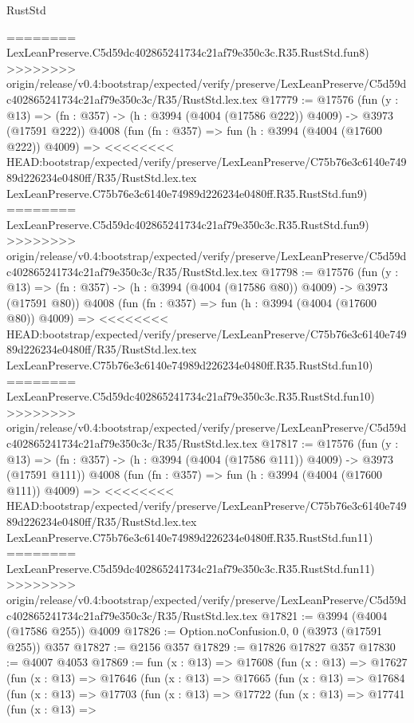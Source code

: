 \begin{lexlean}{RustStd}
\begin{coremodule}
{\begin{coremodule}
{{{{{{{{{{{{{{{{========
    LexLeanPreserve.C5d59dc402865241734c21af79e350c3c.R35.RustStd.fun8)
>>>>>>>> origin/release/v0.4:bootstrap/expected/verify/preserve/LexLeanPreserve/C5d59dc402865241734c21af79e350c3c/R35/RustStd.lex.tex
@17779 := @17576
    (fun (y : @13) => (fn : @357) -> (h : @3994 (@4004 (@17586 @222)) @4009) -> @3973 (@17591 @222))
    @4008
    (fun (fn : @357) =>
    fun (h : @3994 (@4004 (@17600 @222)) @4009) =>
<<<<<<<< HEAD:bootstrap/expected/verify/preserve/LexLeanPreserve/C75b76e3c6140e74989d226234e0480ff/R35/RustStd.lex.tex
    LexLeanPreserve.C75b76e3c6140e74989d226234e0480ff.R35.RustStd.fun9)
========
    LexLeanPreserve.C5d59dc402865241734c21af79e350c3c.R35.RustStd.fun9)
>>>>>>>> origin/release/v0.4:bootstrap/expected/verify/preserve/LexLeanPreserve/C5d59dc402865241734c21af79e350c3c/R35/RustStd.lex.tex
@17798 := @17576
    (fun (y : @13) => (fn : @357) -> (h : @3994 (@4004 (@17586 @80)) @4009) -> @3973 (@17591 @80))
    @4008
    (fun (fn : @357) =>
    fun (h : @3994 (@4004 (@17600 @80)) @4009) =>
<<<<<<<< HEAD:bootstrap/expected/verify/preserve/LexLeanPreserve/C75b76e3c6140e74989d226234e0480ff/R35/RustStd.lex.tex
    LexLeanPreserve.C75b76e3c6140e74989d226234e0480ff.R35.RustStd.fun10)
========
    LexLeanPreserve.C5d59dc402865241734c21af79e350c3c.R35.RustStd.fun10)
>>>>>>>> origin/release/v0.4:bootstrap/expected/verify/preserve/LexLeanPreserve/C5d59dc402865241734c21af79e350c3c/R35/RustStd.lex.tex
@17817 := @17576
    (fun (y : @13) => (fn : @357) -> (h : @3994 (@4004 (@17586 @111)) @4009) -> @3973 (@17591 @111))
    @4008
    (fun (fn : @357) =>
    fun (h : @3994 (@4004 (@17600 @111)) @4009) =>
<<<<<<<< HEAD:bootstrap/expected/verify/preserve/LexLeanPreserve/C75b76e3c6140e74989d226234e0480ff/R35/RustStd.lex.tex
    LexLeanPreserve.C75b76e3c6140e74989d226234e0480ff.R35.RustStd.fun11)
========
    LexLeanPreserve.C5d59dc402865241734c21af79e350c3c.R35.RustStd.fun11)
>>>>>>>> origin/release/v0.4:bootstrap/expected/verify/preserve/LexLeanPreserve/C5d59dc402865241734c21af79e350c3c/R35/RustStd.lex.tex
@17821 := @3994 (@4004 (@17586 @255)) @4009
@17826 := Option.noConfusion.{0, 0} (@3973 (@17591 @255)) @357
@17827 := @2156 @357
@17829 := @17826 @17827 @357
@17830 := @4007 @4053
@17869 := fun (x : @13) =>
  @17608
    (fun (x : @13) =>
    @17627
      (fun (x : @13) =>
      @17646
        (fun (x : @13) =>
        @17665
          (fun (x : @13) =>
          @17684
            (fun (x : @13) =>
            @17703
              (fun (x : @13) =>
              @17722
                (fun (x : @13) =>
                @17741
                  (fun (x : @13) =>
}}}}}}}}}}}}}}}}
\end{coremodule}}
\end{coremodule}
\end{lexlean}
